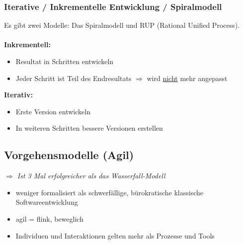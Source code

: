 \subsubsection{Iterative / Inkrementelle Entwicklung / Spiralmodell}
Es gibt zwei Modelle: Das Spiralmodell und RUP (Rational Unified Process).\\
\\
	\textbf{Inkrementell:}
		\begin{itemize}
			\item Resultat in Schritten entwickeln
			\item Jeder Schritt ist Teil des Endresultats \newline $\Rightarrow$ wird \underline{nicht} mehr angepasst
		\end{itemize}
	\textbf{Iterativ:}
		\begin{itemize}					
			\item Erste Version entwickeln
			\item In weiteren Schritten bessere Versionen erstellen
		\end{itemize}

\subsection{Vorgehensmodelle (Agil)}
\textit{$\Rightarrow$ Ist 3 Mal erfolgreicher als das Wasserfall-Modell}
\begin{itemize}
	\item weniger formalisiert als schwerfällige, bürokratische klassische Softwareentwicklung
	\item agil = flink, beweglich
	\item Individuen und Interaktionen gelten mehr als Prozesse und Tools
\end{itemize}

